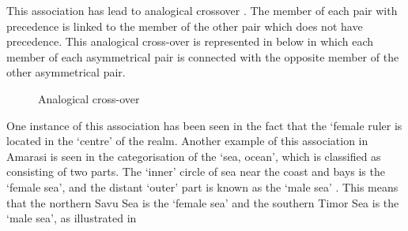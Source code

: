 This association has lead to analogical crossover \citep{fo89}.
The member of each pair with precedence
is linked to the member of the other pair which does not have precedence.
This analogical cross-over is represented in  below
in which each member of each asymmetrical pair is connected
with the opposite member of the other asymmetrical pair.

\begin{figure}[h]
\caption{Analogical cross-over}\label{fig:AnaCro}
	\begin{minipage}{.49\textwidth}
	\end{minipage}
	\begin{minipage}{.49\textwidth}
	\end{minipage}
\end{figure}

One instance of this association has been seen in the fact that the  `female ruler
is located in the  `centre' of the realm.
Another example of this association in Amarasi is seen in the categorisation
of the  `sea, ocean', which is classified as consisting of two parts.
The  `inner' circle of sea near the coast and bays
is the  `female sea', and the distant  `outer' part
is known as the  `male sea' \cite[50]{cu64}.
This means that the northern Savu Sea is the  `female sea'
and the southern Timor Sea is the  `male sea',
as illustrated in 

